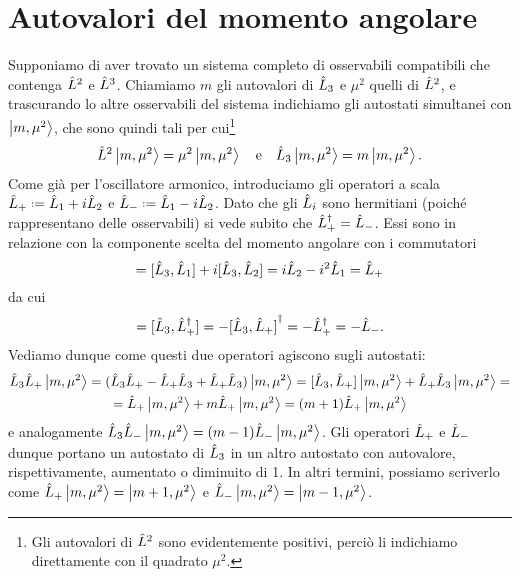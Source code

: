 \section{Autovalori del momento angolare}
Supponiamo di aver trovato un sistema completo di osservabili compatibili che contenga $\hat{L}^2$ e $\hat{L}^3$.
Chiamiamo $m$ gli autovalori di $\hat{L}_3$ e $\mu^2$ quelli di $\hat{L}^2$, e trascurando lo altre osservabili del sistema indichiamo gli autostati simultanei con $\left|{m,\mu^2}\right\rangle$, che sono quindi tali per cui\footnote{Gli autovalori di $\hat{L}^2$ sono evidentemente positivi, perciò li indichiamo direttamente con il quadrato $\mu^2$.}
\begin{equation}
	\hat{L}^2\left|{m,\mu^2}\right\rangle=\mu^2\left|{m,\mu^2}\right\rangle\quad\text{e}\quad\hat{L}_3\left|{m,\mu^2}\right\rangle=m\left|{m,\mu^2}\right\rangle.
\end{equation}
Come già per l'oscillatore armonico, introduciamo gli operatori a scala $\op L_+\defeq\op L_1+i\op L_2$ e $\op L_-\defeq\op L_1-i\op L_2$.
Dato che gli $\hat{L}_i$ sono hermitiani (poich\'e rappresentano delle osservabili) si vede subito che ${\hat{L}_+}^\dagger=\hat{L}_-$.
Essi sono in relazione con la componente scelta del momento angolare con i commutatori
\begin{equation}
	[\op L_3,\op L_+]=[\op L_3,\op L_1]+i[\op L_3,\op L_2]=i\op L_2-i^2\op L_1=\op L_+
\end{equation}
da cui
\begin{equation}
	[\op L_3,\op L_-]=[\op L_3,\adj{\op L_+}]=-\adj{[\op L_3,\op L_+]}=-\adj{\op L_+}=-\op L_-.
\end{equation}
Vediamo dunque come questi due operatori agiscono sugli autostati:
\begin{multline}
	\hat{L}_3\hat{L}_+\left|{m,\mu^2}\right\rangle=(\hat{L}_3\hat{L}_+ - \hat{L}_+\hat{L}_3 + \hat{L}_+\hat{L}_3)\left|{m,\mu^2}\right\rangle=[\hat{L}_3,\hat{L}_+]\left|{m,\mu^2}\right\rangle+\hat{L}_+\hat{L}_3\left|{m,\mu^2}\right\rangle=\\=
	\hat{L}_+\left|{m,\mu^2}\right\rangle+m\hat{L}_+\left|{m,\mu^2}\right\rangle=(m+1)\hat{L}_+\left|{m,\mu^2}\right\rangle
\end{multline}
e analogamente $\hat{L}_3\hat{L}_-\left|{m,\mu^2}\right\rangle=(m-1)\hat{L}_-\left|{m,\mu^2}\right\rangle$.
Gli operatori $\hat{L}_+$ e $\hat{L}_-$ dunque portano un autostato di $\hat{L}_3$ in un altro autostato con autovalore, rispettivamente, aumentato o diminuito di 1.
In altri termini, possiamo scriverlo come $\hat{L}_+\left|{m,\mu^2}\right\rangle=\left|{m+1,\mu^2}\right\rangle$ e $\hat{L}_-\left|{m,\mu^2}\right\rangle=\left|{m-1,\mu^2}\right\rangle$.


